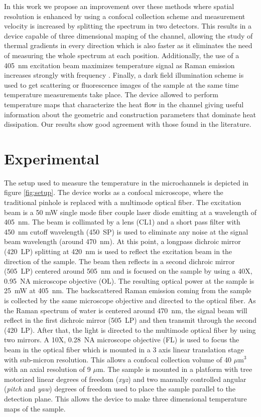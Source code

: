 \documentclass[9pt,twocolumn,twoside]{osajnl}
\begin{document}
In this work we propose an improvement over these methods where spatial resolution is enhanced by using a confocal collection scheme and measurement velocity is increased by splitting the spectrum in two detectors. This results in a device capable of three dimensional maping of the channel, allowing the study of thermal gradients in every direction which is also faster as it eliminates the need of measuring the whole spectrum at each position. Additionally, the use of a 405~nm excitation beam maximizes temperature signal as Raman emission increases strongly with frequency \cite{faris}. Finally, a dark field illumination scheme is used to get scattering or fluorescence images of the sample at the same time temperature measurements take place. The device allowed to perform temperature maps that characterize the heat flow in the channel giving useful information about the geometric and construction parameters that dominate heat dissipation. Our results show good agreement with those found in the literature. 

\section{Experimental}

The setup used to measure the temperature in the microchannels is depicted in figure \ref{fig:setup}. The device works as a confocal microscope, where the traditional pinhole is replaced with a multimode optical fiber. The excitation beam is a 50 mW single mode fiber couple laser diode emitting at a wavelength of 405~nm. The beam is collimated by a lens (CL1) and a short pass filter with 450~nm cutoff wavelength (450~SP) is used to eliminate any noise at the signal beam wavelength (around 470~nm). At this point, a longpass dichroic mirror (420~LP) splitting at 420~nm is used to reflect the excitation beam in the direction of the sample. The beam then reflects in a second dichroic mirror (505~LP) centered around 505~nm and is focused on the sample by using a 40X, 0.95~NA microscope objective (OL). The resulting optical power at the sample is 25~mW at 405~nm. The backscattered Raman emission coming from the sample is collected by the same microscope objective and directed to the optical fiber. As the Raman spectrum of water is centered around 470~nm, the signal beam will reflect in the first dichroic mirror (505~LP) and then transmit through the second (420~LP). After that, the light is directed to the multimode optical fiber by using two mirrors. A 10X, 0.28~NA microscope objective (FL) is used to focus the beam in the optical fiber which is mounted in a 3 axis linear translation stage with sub-micron resolution. This allows a confocal collection volume of 40 $\mu\mathrm{m^3}$ with an axial resolution of 9 $\mu\mathrm{m}$. The sample is mounted in a platform with tree motorized linear degrees of freedom (\textit{xyz}) and two manually controlled angular (\textit{pitch} and \textit{yaw}) degrees of freedom used to place the sample parallel to the detection plane. This allows the device to make three dimensional temperature maps of the sample.
\end{document}
